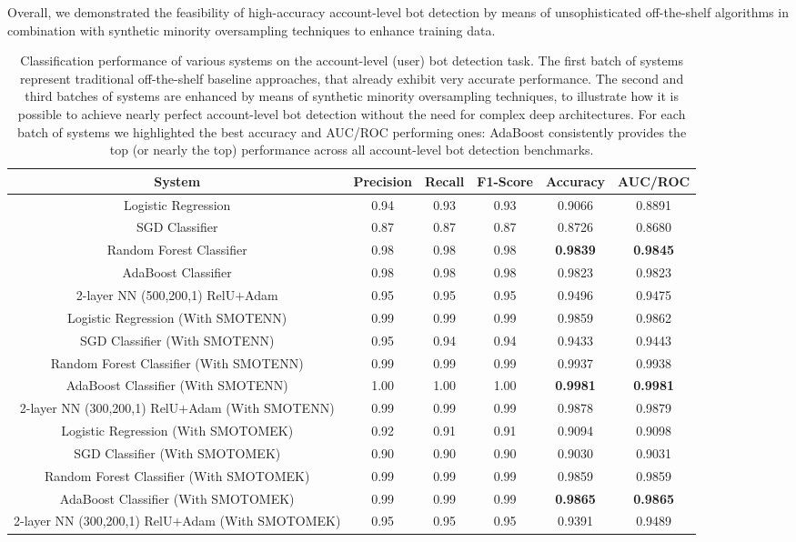 Overall, we demonstrated the feasibility of high-accuracy account-level bot detection by means of unsophisticated off-the-shelf algorithms in combination with synthetic minority oversampling techniques to enhance training data.

\begin{table*}[t]\small
  \centering
  \begin{tabular}{ |c|c|c|c|c|c| }
    \hline 
System & Precision & Recall & F1-Score & Accuracy & AUC/ROC \\
  \hline
  Logistic Regression & 0.94 & 0.93 & 0.93 & 0.9066 & 0.8891 \\ 
  SGD Classifier & 0.87 & 0.87 & 0.87 & 0.8726 & 0.8680 \\ 
  Random Forest Classifier & 0.98 & 0.98 & 0.98 & \textbf{0.9839} & \textbf{0.9845} \\ 
  AdaBoost Classifier & 0.98 & 0.98 & 0.98 & 0.9823 & 0.9823 \\ 
  2-layer NN (500,200,1) RelU$+$Adam & 0.95 & 0.95 & 0.95 & 0.9496 & 0.9475 \\ \hline 
  Logistic Regression  (With SMOTENN) & 0.99 & 0.99 & 0.99 & 0.9859 & 0.9862 \\ 
SGD Classifier (With SMOTENN) & 0.95 & 0.94 & 0.94 & 0.9433 & 0.9443 \\ 
Random Forest Classifier (With SMOTENN) & 0.99 & 0.99 & 0.99 & 0.9937 & 0.9938 \\ 
AdaBoost Classifier (With SMOTENN)  & 1.00 & 1.00 & 1.00 & \textbf{0.9981} & \textbf{0.9981} \\ 
2-layer NN (300,200,1) RelU$+$Adam (With SMOTENN) & 0.99 & 0.99 & 0.99 & 0.9878 & 0.9879 \\ \hline 
  Logistic Regression (With SMOTOMEK) & 0.92 & 0.91 & 0.91 & 0.9094 & 0.9098 \\ 
SGD Classifier (With SMOTOMEK) & 0.90 & 0.90 & 0.90 & 0.9030 & 0.9031 \\ 
Random Forest Classifier (With SMOTOMEK) & 0.99 & 0.99 & 0.99 & 0.9859 & 0.9859 \\ 
AdaBoost Classifier (With SMOTOMEK) & 0.99 & 0.99 & 0.99 & \textbf{0.9865} & \textbf{0.9865} \\ 
2-layer NN (300,200,1) RelU$+$Adam (With SMOTOMEK) & 0.95 & 0.95 & 0.95 & 0.9391 & 0.9489 \\ 
\hline
  \end{tabular}
  \caption{Classification performance of various systems on the account-level (user) bot detection task. The first batch of systems represent traditional off-the-shelf baseline approaches, that already exhibit very accurate performance. The second and third batches of systems are enhanced by means of synthetic minority oversampling techniques, to illustrate how it is possible to achieve nearly perfect account-level bot detection without the need for complex deep architectures. For each batch of systems we highlighted the best accuracy and AUC/ROC performing ones: AdaBoost consistently provides the top (or nearly the top) performance across all account-level bot detection benchmarks. }
  \label{tab:1}\vspace*{-.6cm}
\end{table*}
